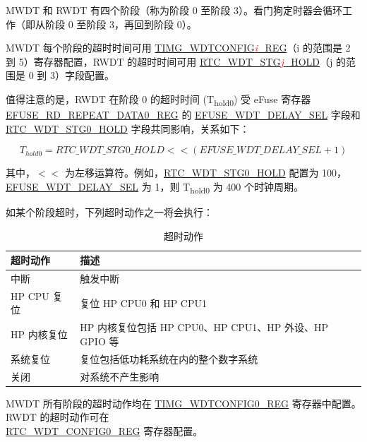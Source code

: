 \documentclass[main\_\_CN.tex]{subfiles}
\begin{document}
MWDT 和 RWDT 有四个阶段（称为阶段 0 至阶段 3）。看门狗定时器会循环工作（即从阶段 0 至阶段 3，再回到阶段 0）。

MWDT 每个阶段的超时时间可用 \hyperref[regdesc:TIMGWDTCONFIG2REG]{TIMG\_WDTCONFIG\textcolor{red}{\it{i}}\_REG}（i 的范围是 2 到 5）寄存器配置，RWDT 的超时时间可用 \hyperref[fielddesc:RTCWDTSTG3HOLD]{RTC\_WDT\_STG\textcolor{red}{\it{j}}\_HOLD}（j 的范围是 0 到 3）字段配置。

值得注意的是，RWDT 在阶段 0 的超时时间 (T\textsubscript{hold0}) 受 eFuse 寄存器 \hyperref[regdesc:EFUSERDREPEATDATA0REG]{EFUSE\_RD\_REPEAT\_DATA0\_REG} 的 \hyperref[fielddesc:EFUSEWDTDELAYSEL]{EFUSE\_WDT\_DELAY\_SEL} 字段和 \hyperref[fielddesc:RTCWDTSTG0HOLD]{RTC\_WDT\_STG0\_HOLD} 字段共同影响，关系如下：

\begin{displaymath}
T_{hold0} = \hyperref[fielddesc:RTCWDTSTG0HOLD]{RTC\_WDT\_STG0\_HOLD}   << (\hyperref[fielddesc:EFUSEWDTDELAYSEL]{EFUSE\_WDT\_DELAY\_SEL} + 1)
\end{displaymath}

其中，$<<$ 为左移运算符。例如，\hyperref[fielddesc:RTCWDTSTG0HOLD]{RTC\_WDT\_STG0\_HOLD} 配置为 100，\hyperref[fielddesc:EFUSEWDTDELAYSEL]{EFUSE\_WDT\_DELAY\_SEL} 为 1，则 T\textsubscript{hold0} 为 400 个时钟周期。

如某个阶段超时，下列超时动作之一将会执行：

\begin{table}[H]
\centering
\caption{超时动作}
\label{tab:wdt-timeout-action}

\begin{tabular}{|l|m{12cm}|}
\hline
\rowcolor{lightgray}
    \textbf{超时动作} & \textbf{描述} \\\hline


    中断 &  触发中断 \\ \hline
    HP CPU 复位 &  复位 HP CPU0 和 HP CPU1\\ \hline
    HP 内核复位 & HP 内核复位包括 HP CPU0、HP CPU1、HP 外设、HP GPIO 等\\ \hline
    系统复位 &  复位包括低功耗系统在内的整个数字系统 \\ \hline
    关闭 &  对系统不产生影响\\ \hline

\end{tabular}
\end{table}

MWDT 所有阶段的超时动作均在 \hyperref[regdesc:TIMGWDTCONFIG0REG]{TIMG\_WDTCONFIG0\_REG} 寄存器中配置。RWDT 的超时动作可在\\ \hyperref[regdesc:RTCWDTCONFIG0REG]{RTC\_WDT\_CONFIG0\_REG} 寄存器配置。
\end{document}
